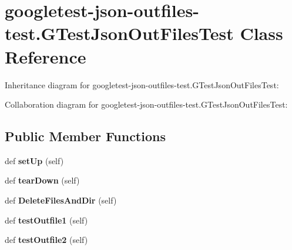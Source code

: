 \hypertarget{classgoogletest-json-outfiles-test_1_1GTestJsonOutFilesTest}{}\section{googletest-\/json-\/outfiles-\/test.G\+Test\+Json\+Out\+Files\+Test Class Reference}
\label{classgoogletest-json-outfiles-test_1_1GTestJsonOutFilesTest}


Inheritance diagram for googletest-\/json-\/outfiles-\/test.G\+Test\+Json\+Out\+Files\+Test\+:


Collaboration diagram for googletest-\/json-\/outfiles-\/test.G\+Test\+Json\+Out\+Files\+Test\+:
\subsection*{Public Member Functions}
\begin{DoxyCompactItemize}
\item 
\mbox{\label{classgoogletest-json-outfiles-test_1_1GTestJsonOutFilesTest_a4d377334ff0527f037a83158faf9f92f}} 
def {\bfseries set\+Up} (self)
\item 
\mbox{\label{classgoogletest-json-outfiles-test_1_1GTestJsonOutFilesTest_a26ac17ebec0c197135a217794e11ce58}} 
def {\bfseries tear\+Down} (self)
\item 
\mbox{\label{classgoogletest-json-outfiles-test_1_1GTestJsonOutFilesTest_a382ecae11a217d1a972d694996485e4b}} 
def {\bfseries Delete\+Files\+And\+Dir} (self)
\item 
\mbox{\label{classgoogletest-json-outfiles-test_1_1GTestJsonOutFilesTest_a3efb5b896cde155ecbc766432acd81ec}} 
def {\bfseries test\+Outfile1} (self)
\item 
\mbox{\label{classgoogletest-json-outfiles-test_1_1GTestJsonOutFilesTest_a4ab6e77d7eb415cb339b42e9273730b7}} 
def {\bfseries test\+Outfile2} (self)
\end{DoxyCompactItemize}
